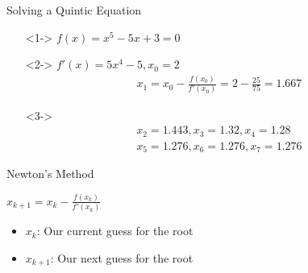 \documentclass[aspectratio=169,xcolor=dvipsnames]{beamer}
\begin{document}
\begin{frame}{Solving a Quintic Equation}
    \begin{itemize}
        \centering
        \item[]<1-> $f(x) = x^5-5x+3 = 0$
        \item[]<2-> $f'(x) = 5x^4-5, x_0 = 2$
        \begin{gather*}
            x_1 = x_0 - \frac{f(x_0)}{f'(x_0)} = 2 - \frac{25}{75} = 1.667
        \end{gather*}
        \item[]<3->
        \begin{gather*}
            x_2 = 1.443, x_3 = 1.32 , x_4 = 1.28 \\
            x_5 = 1.276, x_6 = 1.276, x_7 = 1.276
        \end{gather*}
    \end{itemize}
\end{frame}

\begin{frame}{Newton's Method}
    \begin{center}
        \Huge $x_{k+1} = x_k - \frac{f(x_k)}{f'(x_k)}$
    \end{center}
    \begin{itemize}
        \item $x_k$: Our current guess for the root
        \item $x_{k+1}$: Our next guess for the root
    \end{itemize}
\end{frame}
\end{document}
